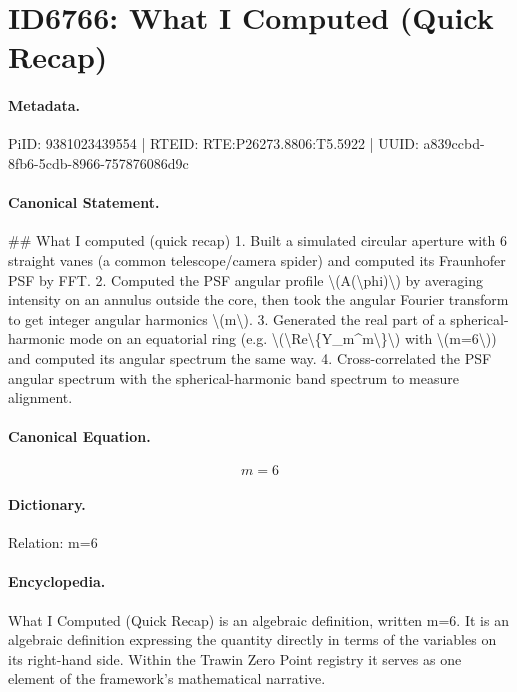\section*{ID6766: What I Computed (Quick Recap)}
\paragraph{Metadata.}
PiID: 9381023439554 | RTEID: RTE:P26273.8806:T5.5922 | UUID: a839ccbd-8fb6-5cdb-8966-757876086d9c

\paragraph{Canonical Statement.}
\#\# What I computed (quick recap) 1. Built a simulated circular aperture with 6 straight vanes (a common telescope/camera spider) and computed its Fraunhofer PSF by FFT. 2. Computed the PSF angular profile \textbackslash{}(A(\textbackslash{}phi)\textbackslash{}) by averaging intensity on an annulus outside the core, then took the angular Fourier transform to get integer angular harmonics \textbackslash{}(m\textbackslash{}). 3. Generated the real part of a spherical-harmonic mode on an equatorial ring (e.g. \textbackslash{}(\textbackslash{}Re\textbackslash{}\{Y\_m\textasciicircum{}m\textbackslash{}\}\textbackslash{}) with \textbackslash{}(m=6\textbackslash{})) and computed its angular spectrum the same way. 4. Cross-correlated the PSF angular spectrum with the spherical-harmonic band spectrum to measure alignment.

\paragraph{Canonical Equation.}
\[
m=6
\]

\paragraph{Dictionary.}
Relation: m=6

\paragraph{Encyclopedia.}
What I Computed (Quick Recap) is an algebraic definition, written m=6. It is an algebraic definition expressing the quantity directly in terms of the variables on its right-hand side. Within the Trawin Zero Point registry it serves as one element of the framework's mathematical narrative.
